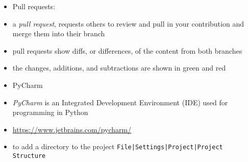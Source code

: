\documentclass[onecolumn]{IEEEtran} %
\begin{document}
\begin{itemize}
        \item Pull requests:
        \bi 
             \item a \emph{pull request}, requests others to review and pull in your contribution and merge them into their branch
             \item pull requests show diffs, or differences, of the content from both branches
             \item the changes, additions, and subtractions are shown in green and red
        \ei 
    \ei
    \item PyCharm
    \bi
        \item \emph{PyCharm} is an Integrated Development Environment (IDE) used for programming in Python
        \item \url{https://www.jetbrains.com/pycharm/}
        \item to add a directory to the project \newline
            \verb!File|Settings|Project|Project Structure!
    \ei
\end{itemize}
\end{document}
